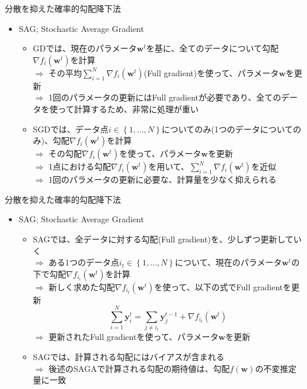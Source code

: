 \documentclass[dvipdfmx,notheorems,t]{beamer}
\begin{document}
\begin{frame}{分散を抑えた確率的勾配降下法}

\begin{itemize}
	\item SAG; Stochastic Average Gradient
	\begin{itemize}
		\item GDでは、現在のパラメータ$\bm{w}^t$を基に、\alert{全てのデータについて}勾配$\nabla f_i(\bm{w}^t)$を計算 \\
		$\Rightarrow$ その平均$\sum_{i = 1}^N \nabla f_i(\bm{w}^t)$(\alert{Full gradient})を使って、パラメータ$\bm{w}$を更新 \\
		$\Rightarrow$ 1回のパラメータの更新にはFull gradientが必要であり、全てのデータを使って計算するため、非常に処理が重い
		\newline
		
		\item SGDでは、データ点$i \in \left\{ 1, \ldots, N \right\}$についてのみ(\alert{1つのデータについてのみ})、勾配$\nabla f_i(\bm{w}^t)$を計算 \\
		$\Rightarrow$ その勾配$\nabla f_i(\bm{w}^t)$を使って、パラメータ$\bm{w}$を更新 \\
		$\Rightarrow$ 1点における勾配$\nabla f_i(\bm{w}^t)$を用いて、$\sum_{i = 1}^N \nabla f_i(\bm{w}^t)$を近似 \\
		$\Rightarrow$ 1回のパラメータの更新に必要な、計算量を少なく抑えられる
	\end{itemize}
\end{itemize}

\end{frame}

\begin{frame}{分散を抑えた確率的勾配降下法}

\begin{itemize}
	\item SAG; Stochastic Average Gradient
	\begin{itemize}		
		\item SAGでは、全データに対する勾配(Full gradient)を、\alert{少しずつ更新していく} \\
		$\Rightarrow$ ある1つのデータ点$i_t \in \left\{ 1, \ldots, N \right\}$について、現在のパラメータ$\bm{w}^t$の下で勾配$\nabla f_{i_t}(\bm{w}^t)$を計算 \\
		$\Rightarrow$ 新しく求めた勾配$\nabla f_{i_t}(\bm{w}^t)$を使って、以下の式でFull gradientを更新 \\
		\begin{equation}
			\sum_{i = 1}^N \bm{y}_i^t = \sum_{j \neq i_t} \bm{y}_j^{t - 1} + \nabla f_{i_t}(\bm{w}^t)
		\end{equation}
		$\Rightarrow$ 更新されたFull gradientを使って、パラメータ$\bm{w}$を更新
		\newline
		
		\item SAGでは、計算される勾配にはバイアスが含まれる \\
		$\Rightarrow$ 後述の\alert{SAGA}で計算される勾配の期待値は、勾配$f(\bm{w})$の不変推定量に一致
	\end{itemize}
\end{itemize}

\end{frame}
\end{document}
